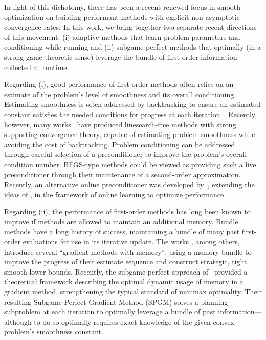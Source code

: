 \documentclass[11pt]{article}
\numberwithin{equation}{section}
\theoremstyle{definition}
\theoremstyle{plain}
\theoremstyle{definition}
\begin{document}
In light of this dichotomy, there has been a recent renewed focus in smooth optimization on building performant methods with explicit non-asymptotic convergence rates. In this work, we bring together two separate recent directions of this movement: (i) adaptive methods that learn problem parameters and conditioning while running and (ii) subgame perfect methods that optimally (in a strong game-theoretic sense) leverage the bundle of first-order information collected at runtime.

Regarding (i), good performance of first-order methods often relies on an estimate of the problem's level of smoothness and its overall conditioning. Estimating smoothness is often addressed by backtracking to ensure an estimated constant satisfies the needed conditions for progress at each iteration~\cite{FISTA_BeckTeboulle,UFGM_Nesterov}. Recently, however, many works~\cite{AdaNAG_Suh,AdGD_Malitsky,AdGD_Prox2_Malitsky,ACFGM_Li,NAGFree_Cavalcanti,AdaptiveProximalLocalLipschitz_Latafat,AdaptivePrimalDual_Vladarean,AdaptiveAltMinimization_Latafat,LinesearchFreeNonconvex_Yagishita,AdaptiveUniversal_Oikonomidis,AutoconditionedProjected_LanLiXu} have produced linesearch-free methods with strong supporting convergence theory, capable of estimating problem smoothness while avoiding the cost of backtracking. Problem conditioning can be addressed through careful selection of a preconditioner to improve the problem's overall condition number. BFGS-type methods could be viewed as providing such a live preconditioner through their maintenance of a second-order approximation. Recently, an alternative online preconditioner was developed by~\cite{OnlineScaling_Gao}, extending the ideas of \cite{MultidimensionalBacktracking_Kunstner}, in the framework of online learning to optimize performance.

Regarding (ii), the performance of first-order methods has long been known to improve if methods are allowed to maintain an additional memory. Bundle methods \cite{Bundle_Kiwiel,BundleProximity_Kiwiel,VariantsOfBundleMethods,BundleLevel_Lan} have a long history of success, maintaining a bundle of many past first-order evaluations for use in its iterative update. The works \cite{OGMM_Florea,GMM_Nesterov}, among others, introduce several ``gradient methods with memory'', using a memory bundle to improve the progress of their estimate sequence and construct strategic, tight smooth lower bounds. Recently, the subgame perfect approach of~\cite{SPGM} provided a theoretical framework describing the optimal dynamic usage of memory in a gradient method, strengthening the typical standard of minimax optimality. Their resulting Subgame Perfect Gradient Method (SPGM) solves a planning subproblem at each iteration to optimally leverage a bundle of past information---although to do so optimally requires exact knowledge of the given convex problem's smoothness constant.
\end{document}
